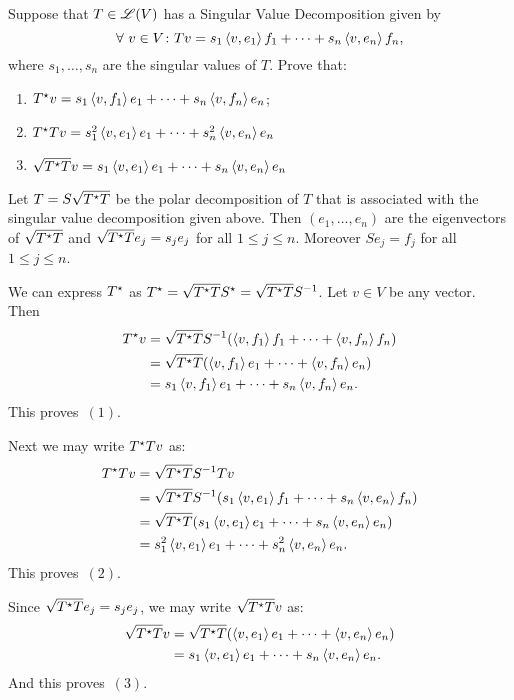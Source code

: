 \begin{exercise}
Suppose that $T \in \mathscr{L}(V)$ has a Singular Value Decomposition given by
\[
    \forall \ v \in V \colon T v =
    s_1 \left \langle v, e_1 \right \rangle f_1 + \cdots + s_n \left \langle v, e_n \right \rangle f_n,
\]
where $s_1, \ldots, s_n$ are the singular values of $T$. Prove that:
\begin{enumerate}
    \item $T^{\star} v = s_1 \left \langle v, f_1 \right \rangle e_1 + \cdots + s_n \left \langle v, f_n \right \rangle e_n$;
    \item $T^{\star} T v = s_1^2 \left \langle v, e_1 \right \rangle e_1 + \cdots + s_n^2 \left \langle v, e_n \right \rangle e_n$
    \item $\sqrt{T^{\star} T} v = s_1 \left \langle v, e_1 \right \rangle e_1 + \cdots + s_n \left \langle v, e_n \right \rangle e_n$
\end{enumerate}
\end{exercise}
\begin{solution}
Let $T = S \sqrt{T^{\star} T}$ be the polar decomposition of $T$ that is associated
with the singular value decomposition given above. Then $(e_1, \ldots, e_n)$ are
the eigenvectors of $\sqrt{T^{\star} T}$ and $\sqrt{T^{\star} T} e_j = s_j e_j$ for
all $1 \leq j \leq n$. Moreover $S e_j = f_j$ for all $1 \leq j \leq n$.

We can express $T^{\star}$ as $T^{\star} = \sqrt{T^{\star} T} S^{\star} = \sqrt{T^{\star} T} S^{-1}$.
Let $v \in V$ be any vector. Then
\begin{align*}
    T^{\star} v & = \sqrt{T^{\star} T} S^{-1} (\left \langle v, f_1 \right \rangle f_1 + \cdots + \left \langle v, f_n \right \rangle f_n) \\
              & = \sqrt{T^{\star} T} (\left \langle v, f_1 \right \rangle e_1 + \cdots + \left \langle v, f_n \right \rangle e_n) \\
              & = s_1 \left \langle v, f_1 \right \rangle e_1 + \cdots + s_n \left \langle v, f_n \right \rangle e_n.
\end{align*}
This proves~$(1)$.

Next we may write $T^{\star} T v$ as:
\begin{align*}
    T^{\star} T v & = \sqrt{T^{\star} T} S^{-1} T v \\
                & = \sqrt{T^{\star} T} S^{-1} (s_1 \left \langle v, e_1 \right \rangle f_1 + \cdots + s_n \left \langle v, e_n \right \rangle f_n) \\
                & = \sqrt{T^{\star} T} (s_1 \left \langle v, e_1 \right \rangle e_1 + \cdots + s_n \left \langle v, e_n \right \rangle e_n) \\
                & = s_1^2 \left \langle v, e_1 \right \rangle e_1 + \cdots + s_n^2 \left \langle v, e_n \right \rangle e_n.
\end{align*}
This proves~$(2)$.

Since $\sqrt{T^{\star} T} e_j = s_j e_j$, we may write $\sqrt{T^{\star} T} v$ as:
\begin{align*}
    \sqrt{T^{\star} T} v & = \sqrt{T^{\star} T} (\left \langle v, e_1 \right \rangle e_1 + \cdots + \left \langle v, e_n \right \rangle e_n) \\
                       & = s_1 \left \langle v, e_1 \right \rangle e_1 + \cdots + s_n \left \langle v, e_n \right \rangle e_n.
\end{align*}
And this proves~$(3)$.
\end{solution}
